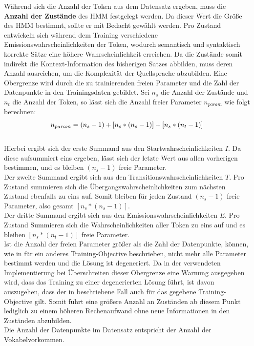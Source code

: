 \documentclass[conference]{IEEEtran}
\begin{document}
Während sich die Anzahl der Token aus dem Datensatz ergeben, muss die \textbf{Anzahl der Zustände} des HMM festgelegt werden. 
Da dieser Wert die Größe des HMM bestimmt, sollte er mit Bedacht gewählt werden.
Pro Zustand entwickeln sich während dem Training verschiedene Emissionswahrscheinlichkeiten der Token, wodurch semantisch und syntaktisch korrekte Sätze eine höhere Wahrscheinlichkeit erreichen.
Da die Zustände somit indirekt die Kontext-Information des bisherigen Satzes abbilden, muss deren Anzahl ausreichen, um die Komplexität der Quellsprache abzubilden.
Eine Obergrenze wird durch die zu trainierenden freien Parameter und die Zahl der Datenpunkte in den Trainingsdaten gebildet.
Sei $n_s$ die Anzahl der Zustände und $n_t$ die Anzahl der Token, so lässt sich die Anzahl freier Parameter $n_{param}$ wie folgt berechnen:
\begin{equation}\notag
n_{param} = (n_s-1) + [n_s * (n_s-1)] + [n_s * (n_t-1)]
\end{equation}\\
Hierbei ergibt sich der erste Summand aus den Startwahrscheinlichkeiten $I$. Da diese aufsummiert eins ergeben, lässt sich der letzte Wert aus allen vorherigen bestimmen, und es bleiben $(n_s-1)$ freie Parameter.\\
Der zweite Summand ergibt sich aus den Transitionswahrscheinlichkeiten $T$.
Pro Zustand summieren sich die Übergangswahrscheinlichkeiten zum nächsten Zustand ebenfalls zu eins auf.
Somit bleiben für jeden Zustand $(n_s-1)$ freie Parameter, also gesamt $[n_s * (n_s-1)]$.\\
Der dritte Summand ergibt sich aus den Emissionswahrscheinlichkeiten $E$.
Pro Zustand Summieren sich die Wahrscheinlichkeiten aller Token zu eins auf und es bleiben $[n_s * (n_t-1)]$ freie Parameter.\\
Ist die Anzahl der freien Parameter größer als die Zahl der Datenpunkte, können, wie in \cite{degenerate} für ein anderes Training-Objective beschrieben, nicht mehr alle Parameter bestimmt werden und die Lösung ist degeneriert.
Da in der verwendeten Implementierung bei Überschreiten dieser Obergrenze eine Warnung ausgegeben wird, dass das Training zu einer degenerierten Lösung führt, ist davon auszugehen, dass der in \cite{degenerate} beschriebene Fall auch für das gegebene Training-Objective gilt.
Somit führt eine größere Anzahl an Zuständen ab diesem Punkt lediglich zu einem höheren Rechenaufwand ohne neue Informationen in den Zuständen abzubilden.\\
Die Anzahl der Datenpunkte im Datensatz entspricht der Anzahl der Vokabelvorkommen.
\end{document}
